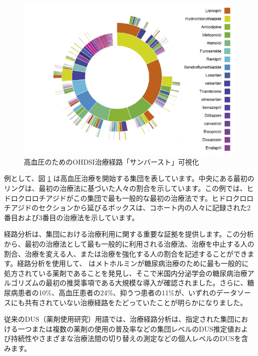 \documentclass[
  11pt]{book}
\theoremstyle{definition}
\theoremstyle{definition}
\theoremstyle{definition}
\theoremstyle{definition}
\theoremstyle{remark}
\begin{document}
\begin{figure}

{\centering \includegraphics[width=1\linewidth]{images/Characterization/pnasTreatmentPathwaysSunburst} 

}

\caption{高血圧のためのOHDSI治療経路「サンバースト」可視化}\label{fig:treatmentPathwaysSunburstDataViz}
\end{figure}

例として、図 \ref{fig:treatmentPathwaysSunburstDataViz} は高血圧治療を開始する集団を表しています。中央にある最初のリングは、最初の治療法に基づいた人々の割合を示しています。この例では、ヒドロクロロチアジドがこの集団で最も一般的な最初の治療法です。ヒドロクロロチアジドのセクションから延びるボックスは、コホート内の人々に記録された2番目および3番目の治療法を示しています。

経路分析は、集団における治療利用に関する重要な証拠を提供します。この分析から、最初の治療法として最も一般的に利用される治療法、治療を中止する人の割合、治療を変える人、または治療を強化する人の割合を記述することができます。経路分析を使用して、\citet{Hripcsak7329} はメトホルミンが糖尿病治療のために最も一般的に処方されている薬剤であることを発見し、そこで米国内分泌学会の糖尿病治療アルゴリズムの最初の推奨事項である大規模な導入が確認されました。さらに、糖尿病患者の10\%、高血圧患者の24\%、抑うつ患者の11\%が、いずれのデータソースにも共有されていない治療経路をたどっていたことが明らかになりました。

従来のDUS（薬剤使用研究）用語では、治療経路分析は、指定された集団における一つまたは複数の薬剤の使用の普及率などの集団レベルのDUS推定値および持続性やさまざまな治療法間の切り替えの測定などの個人レベルのDUSを含みます。
\end{document}
